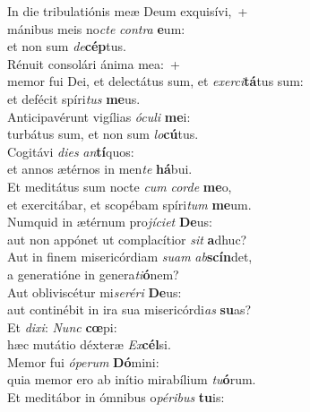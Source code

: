 \evenverse In die tribulatiónis meæ Deum exquisívi,~+\\\evenverse  mánibus meis no\textit{cte} \textit{con}\textit{tra} \textbf{e}um:~\*\\
\evenverse et non sum \textit{de}\textbf{cép}tus.\\
\oddverse Rénuit consolári ánima mea:~+\\
\oddverse  memor fui Dei, et delectátus sum, et \textit{e}\textit{xer}\textit{ci}\textbf{tá}tus sum:~\*\\
\oddverse et defécit spíri\textit{tus} \textbf{me}us.\\
\evenverse Anticipavérunt vigílias \textit{ó}\textit{cu}\textit{li} \textbf{me}i:~\*\\
\evenverse turbátus sum, et non sum \textit{lo}\textbf{cú}tus.\\
\oddverse Cogitávi \textit{di}\textit{es} \textit{an}\textbf{tí}quos:~\*\\
\oddverse et annos ætérnos in men\textit{te} \textbf{há}bui.\\
\evenverse Et meditátus sum nocte \textit{cum} \textit{cor}\textit{de} \textbf{me}o,~\*\\
\evenverse et exercitábar, et scopébam spíri\textit{tum} \textbf{me}um.\\
\oddverse Numquid in ætérnum pro\textit{jí}\textit{ci}\textit{et} \textbf{De}us:~\*\\
\oddverse aut non appónet ut complacítior \textit{sit} \textbf{a}dhuc?\\
\evenverse Aut in finem misericórdiam \textit{su}\textit{am} \textit{ab}\textbf{scín}det,~\*\\
\evenverse a generatióne in genera\textit{ti}\textbf{ó}nem?\\
\oddverse Aut obliviscétur mi\textit{se}\textit{ré}\textit{ri} \textbf{De}us:~\*\\
\oddverse aut continébit in ira sua misericórdi\textit{as} \textbf{su}as?\\
\evenverse Et \textit{di}\textit{xi}: \textit{Nunc} \textbf{cœ}pi:~\*\\
\evenverse hæc mutátio déxteræ \textit{Ex}\textbf{cél}si.\\
\oddverse Memor fui \textit{ó}\textit{pe}\textit{rum} \textbf{Dó}mini:~\*\\
\oddverse quia memor ero ab inítio mirabílium \textit{tu}\textbf{ó}rum.\\
\evenverse Et meditábor in ómnibus o\textit{pé}\textit{ri}\textit{bus} \textbf{tu}is:~\*\\
